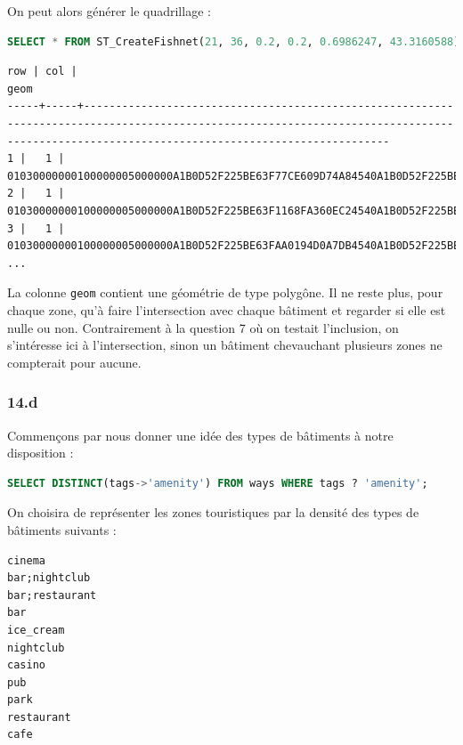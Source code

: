 \documentclass[12pt,a4paper]{article}
\begin{document}
On peut alors générer le quadrillage :

\begin{lstlisting}[language=SQL]
SELECT * FROM ST_CreateFishnet(21, 36, 0.2, 0.2, 0.6986247, 43.3160588);
\end{lstlisting}

\begin{lstlisting}
row | col |                                                                                            geom                                                                                            
-----+-----+--------------------------------------------------------------------------------------------------------------------------------------------------------------------------------------------
1 |   1 | 01030000000100000005000000A1B0D52F225BE63F77CE609D74A84540A1B0D52F225BE63F1168FA360EC2454008173C9688C1EC3F1168FA360EC2454008173C9688C1EC3F77CE609D74A84540A1B0D52F225BE63F77CE609D74A84540
2 |   1 | 01030000000100000005000000A1B0D52F225BE63F1168FA360EC24540A1B0D52F225BE63FAB0194D0A7DB454008173C9688C1EC3FAB0194D0A7DB454008173C9688C1EC3F1168FA360EC24540A1B0D52F225BE63F1168FA360EC24540
3 |   1 | 01030000000100000005000000A1B0D52F225BE63FAA0194D0A7DB4540A1B0D52F225BE63F449B2D6A41F5454008173C9688C1EC3F449B2D6A41F5454008173C9688C1EC3FAA0194D0A7DB4540A1B0D52F225BE63FAA0194D0A7DB4540
...
\end{lstlisting}

La colonne \verb?geom? contient une géométrie de type polygône. Il ne reste plus,
pour chaque zone, qu'à faire l'intersection avec chaque bâtiment et regarder si
elle est nulle ou non. Contrairement à la question 7 où on testait l'inclusion,
on s'intéresse ici à l'intersection, sinon un bâtiment chevauchant plusieurs
zones ne compterait pour aucune.

\subsubsection*{14.d}

Commençons par nous donner une idée des types de bâtiments à notre disposition :

\begin{lstlisting}[language=SQL]
SELECT DISTINCT(tags->'amenity') FROM ways WHERE tags ? 'amenity';
\end{lstlisting}

On choisira de représenter les zones touristiques par la densité des types de
bâtiments suivants :

\begin{lstlisting}
cinema
bar;nightclub
bar;restaurant
bar
ice_cream
nightclub
casino
pub
park
restaurant
cafe
\end{lstlisting}
\end{document}
